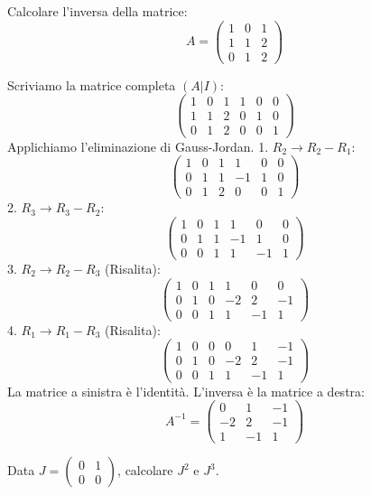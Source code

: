 \begin{exercisebox}[title={Esercizio 2: Inversa con Gauss-Jordan}]
Calcolare l'inversa della matrice:
$$ A = \begin{pmatrix} 1 & 0 & 1 \\ 1 & 1 & 2 \\ 0 & 1 & 2 \end{pmatrix} $$
\end{exercisebox}

\begin{solbox}
Scriviamo la matrice completa $(A|I)$:
$$ \left(\begin{array}{ccc|ccc} 
1 & 0 & 1 & 1 & 0 & 0 \\ 
1 & 1 & 2 & 0 & 1 & 0 \\ 
0 & 1 & 2 & 0 & 0 & 1 
\end{array}\right) $$
Applichiamo l'eliminazione di Gauss-Jordan.
1. $R_2 \to R_2 - R_1$:
$$ \left(\begin{array}{ccc|ccc} 1 & 0 & 1 & 1 & 0 & 0 \\ 0 & 1 & 1 & -1 & 1 & 0 \\ 0 & 1 & 2 & 0 & 0 & 1 \end{array}\right) $$
2. $R_3 \to R_3 - R_2$:
$$ \left(\begin{array}{ccc|ccc} 1 & 0 & 1 & 1 & 0 & 0 \\ 0 & 1 & 1 & -1 & 1 & 0 \\ 0 & 0 & 1 & 1 & -1 & 1 \end{array}\right) $$
3. $R_2 \to R_2 - R_3$ (Risalita):
$$ \left(\begin{array}{ccc|ccc} 1 & 0 & 1 & 1 & 0 & 0 \\ 0 & 1 & 0 & -2 & 2 & -1 \\ 0 & 0 & 1 & 1 & -1 & 1 \end{array}\right) $$
4. $R_1 \to R_1 - R_3$ (Risalita):
$$ \left(\begin{array}{ccc|ccc} 1 & 0 & 0 & 0 & 1 & -1 \\ 0 & 1 & 0 & -2 & 2 & -1 \\ 0 & 0 & 1 & 1 & -1 & 1 \end{array}\right) $$
La matrice a sinistra è l'identità. L'inversa è la matrice a destra:
$$ A^{-1} = \begin{pmatrix} 0 & 1 & -1 \\ -2 & 2 & -1 \\ 1 & -1 & 1 \end{pmatrix} $$
\end{solbox}

\begin{exercisebox}[title={Esercizio 3: Potenze di Matrici}]
Data $J = \begin{pmatrix} 0 & 1 \\ 0 & 0 \end{pmatrix}$, calcolare $J^2$ e $J^3$.
\end{exercisebox}

